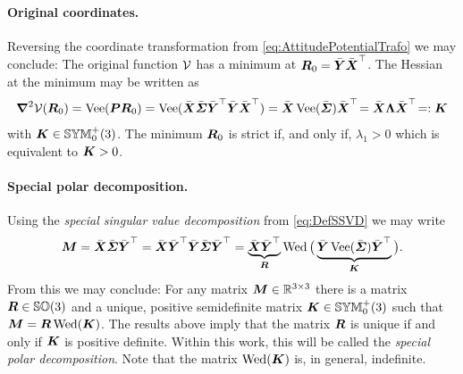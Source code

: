 \paragraph{Original coordinates.}
Reversing the coordinate transformation from \eqref{eq:AttitudePotentialTrafo} we may conclude:
The original function $\mathcal{V}$ has a minimum at $\boldsymbol{R}_0 = \bar{\boldsymbol{Y}} \bar{\boldsymbol{X}}^\top$.
The Hessian at the minimum may be written as
\begin{align}
 \boldsymbol{\nabla}^2 \mathcal{V} (\boldsymbol{R}_0) 
 = \operatorname{Vee}(\boldsymbol{P}\boldsymbol{R}_0) 
 = \operatorname{Vee}(\bar{\boldsymbol{X}} \bar{\boldsymbol{\varSigma}} \bar{\boldsymbol{Y}}^\top \bar{\boldsymbol{Y}} \bar{\boldsymbol{X}}^\top)
 = \bar{\boldsymbol{X}} \operatorname{Vee}(\bar{\boldsymbol{\varSigma}}) \bar{\boldsymbol{X}}^\top\!
 = \bar{\boldsymbol{X}} \boldsymbol{\Lambda} \bar{\boldsymbol{X}}^\top\!
 =: \boldsymbol{K}
\end{align}
with $\boldsymbol{K} \in \mathbb{SYM}^{+}_{0}(3)$.
The minimum $\boldsymbol{R}_0$ is strict if, and only if, $\lambda_1 > 0$ which is equivalent to $\boldsymbol{K} > 0$.

\paragraph{Special polar decomposition.}
Using the \textit{special singular value decomposition} from \eqref{eq:DefSSVD} we may write
\begin{align}
 \boldsymbol{M} = \bar{\boldsymbol{X}} \bar{\boldsymbol{\varSigma}} \bar{\boldsymbol{Y}}^\top
 = \bar{\boldsymbol{X}} \bar{\boldsymbol{Y}}^\top \bar{\boldsymbol{Y}} \bar{\boldsymbol{\varSigma}} \bar{\boldsymbol{Y}}^\top
 = \underbrace{\bar{\boldsymbol{X}} \bar{\boldsymbol{Y}}^\top}_{\boldsymbol{R}} \operatorname{Wed}\big(\underbrace{\bar{\boldsymbol{Y}} \operatorname{Vee}(\bar{\boldsymbol{\varSigma}}) \bar{\boldsymbol{Y}}^\top}_{\boldsymbol{K}}\big).
\end{align}
From this we may conclude:
For any matrix $\boldsymbol{M} \in\mathbb{R}^{3\times3}$ there is a matrix $\boldsymbol{R} \in \mathbb{SO}(3)$ and a unique, positive semidefinite matrix $\boldsymbol{K} \in \mathbb{SYM}^{+}_{0}(3)$ such that $\boldsymbol{M} = \boldsymbol{R} \operatorname{Wed}(\boldsymbol{K})$.
The results above imply that the matrix $\boldsymbol{R}$ is unique if and only if $\boldsymbol{K}$ is positive definite.
Within this work, this will be called the \textit{special polar decomposition}.
Note that the matrix $\operatorname{Wed}(\boldsymbol{K})$ is, in general, indefinite.


